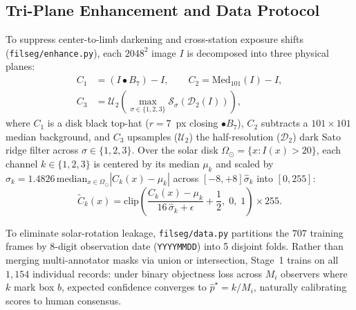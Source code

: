 \documentclass[sigconf]{acmart}
\begin{document}
\subsection{Tri-Plane Enhancement and Data Protocol}
To suppress center-to-limb darkening and cross-station exposure shifts (\texttt{filseg/enhance.py}), each $2048^2$ image $I$ is decomposed into three physical planes:
\begin{equation}\label{eq:planes}
\begin{aligned}
  C_1 &= (I \bullet B_7) - I, \qquad
  C_2 = \mathrm{Med}_{101}(I) - I, \\
  C_3 &= \mathcal{U}_2\!\left(\max_{\sigma\in\{1,2,3\}} \mathcal{S}_{\sigma}(\mathcal{D}_2(I))\right)\!,
\end{aligned}
\end{equation}
where $C_1$ is a disk black top-hat ($r{=}7$~px closing $\bullet B_7$), $C_2$ subtracts a $101\times 101$ median background, and $C_3$ upsamples ($\mathcal{U}_2$) the half-resolution ($\mathcal{D}_2$) dark Sato ridge filter \cite{sato1998three} across $\sigma\in\{1,2,3\}$. Over the solar disk $\Omega_{\odot} = \{x : I(x) > 20\}$, each channel $k\in\{1,2,3\}$ is centered by its median $\mu_k$ and scaled by $\hat{\sigma}_k = 1.4826\,\mathrm{median}_{x\in\Omega_{\odot}}|C_k(x)-\mu_k|$ across $[-8,+8]\hat{\sigma}_k$ into $[0,255]$:
\begin{equation}\label{eq:norm}
  \tilde{C}_k(x) = \mathrm{clip}\!\left(\frac{C_k(x)-\mu_k}{16\,\hat{\sigma}_k + \epsilon} + \frac{1}{2},\; 0,\; 1\right)\times 255.
\end{equation}

To eliminate solar-rotation leakage, \texttt{filseg/data.py} partitions the $707$ training frames by 8-digit observation date (\texttt{YYYYMMDD}) into 5 disjoint folds. Rather than merging multi-annotator masks via union or intersection, Stage~1 trains on all $1{,}154$ individual records: under binary objectness loss across $M_i$ observers where $k$ mark box $b$, expected confidence converges to $\hat{p}^\star = k/M_i$, naturally calibrating scores to human consensus.
\end{document}
